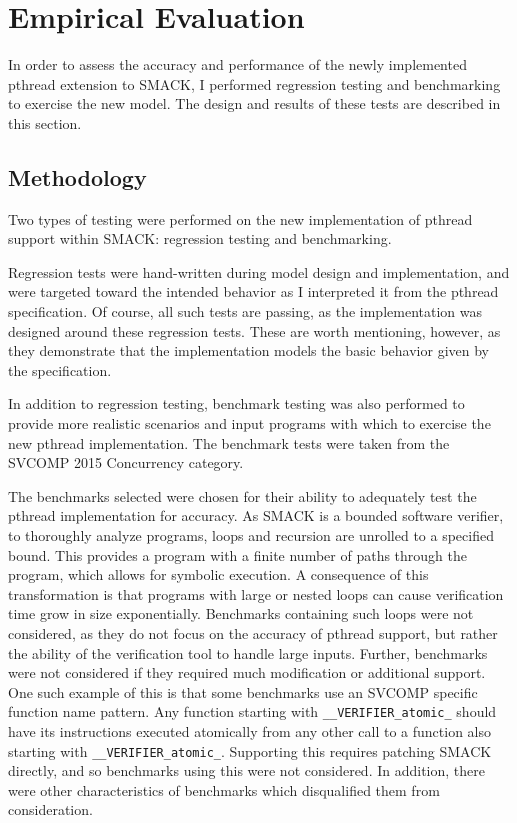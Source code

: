 \chapter{Empirical Evaluation}\label{ch:evaluation}
In order to assess the accuracy and performance of the newly
implemented pthread extension to SMACK, I performed regression testing
and benchmarking to exercise the new model.  The design and results of
these tests are described in this section.

\section{Methodology}\label{sec:methodology}
Two types of testing were performed on the new implementation of
pthread support within SMACK: regression testing and benchmarking.

Regression tests were hand-written during model design and
implementation, and were targeted toward the intended behavior as I
interpreted it from the pthread specification.  Of course, all such
tests are passing, as the implementation was designed around these
regression tests.  These are worth mentioning, however, as they
demonstrate that the implementation models the basic behavior given by
the specification. 

In addition to regression testing, benchmark testing was also
performed to provide more realistic scenarios and input programs with
which to exercise the new pthread implementation.  The benchmark tests
were taken from the SVCOMP 2015 Concurrency category.  

The benchmarks selected were chosen for their ability to adequately
test the pthread implementation for accuracy. As SMACK is a bounded
software verifier, to thoroughly analyze programs, loops and recursion
are unrolled to a specified bound.  This provides a program with a
finite number of paths through the program, which allows for symbolic
execution.  A consequence of this transformation is that programs with
large or nested loops can cause verification time grow in size
exponentially. Benchmarks containing such loops were not
considered, as they do not focus on the accuracy of pthread support,
but rather the ability of the verification tool to handle large
inputs.  Further, benchmarks were not considered if they required much
modification or additional support.  One such example of this is that
some benchmarks use an SVCOMP specific function name pattern.  Any
function starting with \lstinline|__VERIFIER_atomic_| should have its
instructions executed atomically from any other call to a function
also starting with \lstinline|__VERIFIER_atomic_|.  Supporting this
requires patching SMACK directly, and so benchmarks using this were
not considered.  In addition, there were other characteristics of
benchmarks which disqualified them from consideration.

